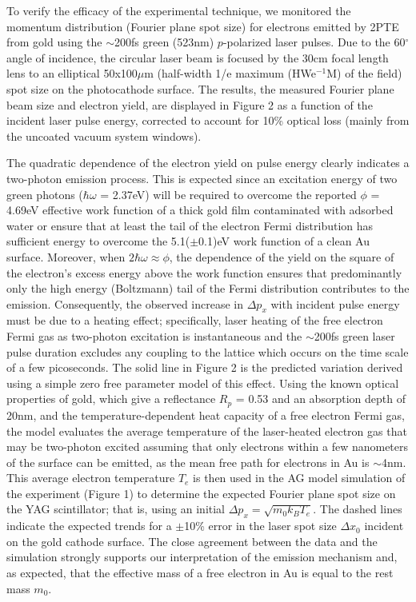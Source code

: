 To verify the efficacy of the experimental technique, we monitored the momentum distribution (Fourier plane spot size) for electrons emitted by 2PTE from gold using the $\sim$200fs green (523nm) $p$-polarized laser pulses.
Due to the 60$^{\circ}$ angle of incidence, the circular laser beam is focused by the 30cm focal length lens to an elliptical 50x100$\mu$m (half-width 1/e maximum (HWe$^{-1}$M) of the field) spot size on the photocathode surface.
The results, the measured Fourier plane beam size and electron yield, are displayed in Figure 2 as a function of the incident laser pulse energy, corrected to account for 10\% optical loss (mainly from the uncoated vacuum system windows).

The quadratic dependence of the electron yield on pulse energy clearly indicates a two-photon emission process.
This is expected since an excitation energy of two green photons ($\hbar \omega$ = 2.37eV) will be required to overcome the reported $\phi$ = 4.69eV effective work function of a thick gold film contaminated with adsorbed water\cite{monjushiro_ultraviolet_1991} or ensure that at least the tail of the electron Fermi distribution has sufficient energy to overcome the 5.1($\pm$0.1)eV work function of a clean Au surface\cite{eastman_photoelectric_1970}.
Moreover, when $2\hbar \omega \approx \phi$, the dependence of the yield on the square of the electron's excess energy above the work function\cite{monjushiro_ultraviolet_1991} ensures that predominantly only the high energy (Boltzmann) tail of the Fermi distribution contributes to the emission.
Consequently, the observed increase in $\Delta p_x$ with incident pulse energy must be due to a heating effect; specifically, laser heating of the free electron Fermi gas as two-photon excitation is instantaneous and the $\sim$200fs green laser pulse duration excludes any coupling to the lattice which occurs on the time scale of a few picoseconds\cite{chen_semiclassical_2006}.
The solid line in Figure 2 is the predicted variation derived using a simple zero free parameter model of this effect.
Using the known optical properties of gold\cite{johnson_optical_1972}, which give a reflectance $R_p$ = 0.53 and an absorption depth of 20nm, and the temperature-dependent heat capacity of a free electron Fermi gas, the model evaluates the average temperature of the laser-heated electron gas that may be two-photon excited assuming that only electrons within a few nanometers of the surface can be emitted, as the mean free path for electrons in Au is $\sim$4nm\cite{seah_quantitative_1979}.
This average electron temperature $T_e$ is then used in the AG model simulation of the experiment (Figure 1) to determine the expected Fourier plane spot size on the YAG scintillator; that is, using an initial $\Delta p_x = \sqrt{m_0 k_B T_e}$.  The dashed lines indicate the expected trends for a $\pm$10\% error in the laser spot size $\Delta x_0$ incident on the gold cathode surface.
The close agreement between the data and the simulation strongly supports our interpretation of the emission mechanism and, as expected, that the effective mass of a free electron in Au is equal to the rest mass $m_0$\cite{johnson_optical_1972}.

